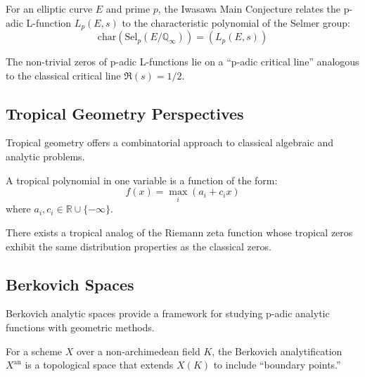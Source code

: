 \begin{definition}
\label{def:iwasawa_main}
For an elliptic curve $E$ and prime $p$, the Iwasawa Main Conjecture relates the p-adic L-function $L_p(E,s)$ to the characteristic polynomial of the Selmer group:
\begin{equation}
\text{char}(\text{Sel}_p(E/\mathbb{Q}_{\infty})) = (L_p(E,s))
\label{eq:iwasawa_main}
\end{equation}
\end{definition}

\begin{conjecture}
\label{conj:padic_rh}
The non-trivial zeros of p-adic L-functions lie on a ``p-adic critical line'' analogous to the classical critical line $\Re(s) = 1/2$.
\end{conjecture}

\subsection{Tropical Geometry Perspectives}

Tropical geometry offers a combinatorial approach to classical algebraic and analytic problems.

\begin{definition}
\label{def:tropical_polynomial}
A tropical polynomial in one variable is a function of the form:
\begin{equation}
f(x) = \max_{i} (a_i + c_i x)
\label{eq:tropical_polynomial}
\end{equation}
where $a_i, c_i \in \mathbb{R} \cup \{-\infty\}$.
\end{definition}

\begin{conjecture}
\label{conj:tropical_rh}
There exists a tropical analog of the Riemann zeta function whose tropical zeros exhibit the same distribution properties as the classical zeros.
\end{conjecture}

\subsection{Berkovich Spaces}

Berkovich analytic spaces provide a framework for studying p-adic analytic functions with geometric methods.

\begin{definition}
\label{def:berkovich_analytification}
For a scheme $X$ over a non-archimedean field $K$, the Berkovich analytification $X^{\text{an}}$ is a topological space that extends $X(K)$ to include ``boundary points.''
\end{definition}


